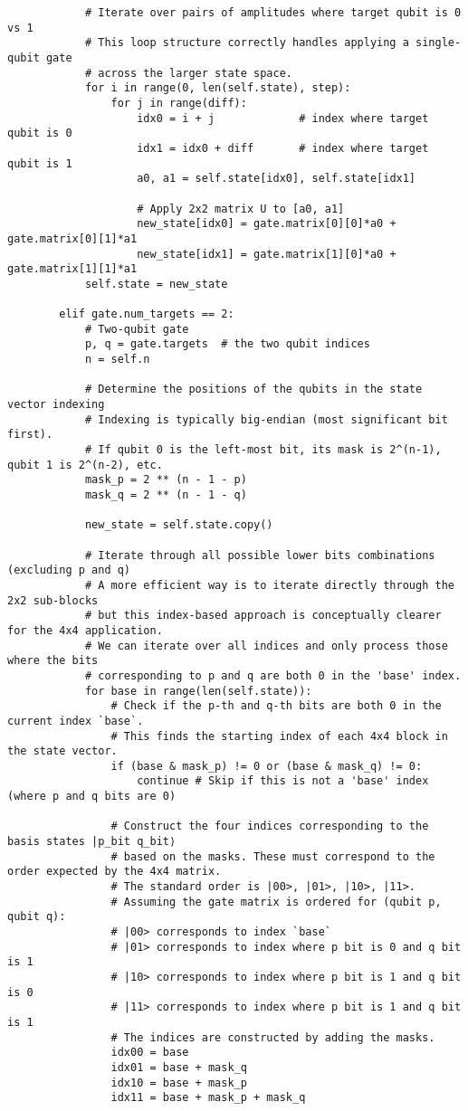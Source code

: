 \documentclass{beamer}
\begin{document}
\begin{frame}
\begin{verbatim}
            # Iterate over pairs of amplitudes where target qubit is 0 vs 1
            # This loop structure correctly handles applying a single-qubit gate
            # across the larger state space.
            for i in range(0, len(self.state), step):
                for j in range(diff):
                    idx0 = i + j             # index where target qubit is 0
                    idx1 = idx0 + diff       # index where target qubit is 1
                    a0, a1 = self.state[idx0], self.state[idx1]

                    # Apply 2x2 matrix U to [a0, a1]
                    new_state[idx0] = gate.matrix[0][0]*a0 + gate.matrix[0][1]*a1
                    new_state[idx1] = gate.matrix[1][0]*a0 + gate.matrix[1][1]*a1
            self.state = new_state

        elif gate.num_targets == 2:
            # Two-qubit gate
            p, q = gate.targets  # the two qubit indices
            n = self.n

            # Determine the positions of the qubits in the state vector indexing
            # Indexing is typically big-endian (most significant bit first).
            # If qubit 0 is the left-most bit, its mask is 2^(n-1), qubit 1 is 2^(n-2), etc.
            mask_p = 2 ** (n - 1 - p)
            mask_q = 2 ** (n - 1 - q)

            new_state = self.state.copy()

            # Iterate through all possible lower bits combinations (excluding p and q)
            # A more efficient way is to iterate directly through the 2x2 sub-blocks
            # but this index-based approach is conceptually clearer for the 4x4 application.
            # We can iterate over all indices and only process those where the bits
            # corresponding to p and q are both 0 in the 'base' index.
            for base in range(len(self.state)):
                # Check if the p-th and q-th bits are both 0 in the current index `base`.
                # This finds the starting index of each 4x4 block in the state vector.
                if (base & mask_p) != 0 or (base & mask_q) != 0:
                    continue # Skip if this is not a 'base' index (where p and q bits are 0)

                # Construct the four indices corresponding to the basis states |p_bit q_bit⟩
                # based on the masks. These must correspond to the order expected by the 4x4 matrix.
                # The standard order is |00>, |01>, |10>, |11>.
                # Assuming the gate matrix is ordered for (qubit p, qubit q):
                # |00> corresponds to index `base`
                # |01> corresponds to index where p bit is 0 and q bit is 1
                # |10> corresponds to index where p bit is 1 and q bit is 0
                # |11> corresponds to index where p bit is 1 and q bit is 1
                # The indices are constructed by adding the masks.
                idx00 = base
                idx01 = base + mask_q
                idx10 = base + mask_p
                idx11 = base + mask_p + mask_q


\end{verbatim}
\end{frame}
\end{document}

